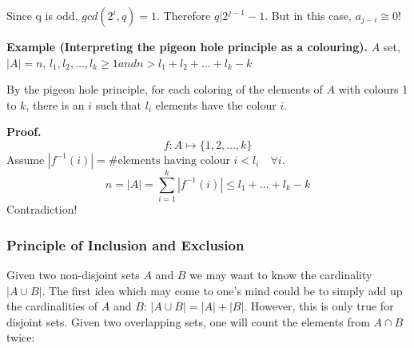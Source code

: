 Since q is odd, $gcd(2^i, q)=1$. Therefore $q | 2^{j-1} - 1$. But in this case, $a_{j-i}\cong 0$!


\textbf{Example (Interpreting the pigeon hole principle as a colouring).}
$A$ set, $|A| = n$,
$l_1, l_2, \ldots, l_k ≥ 1 and n > l_1 + l_2 + \ldots + l_k - k$

By the pigeon hole principle, for each coloring of the elements of $A$ with colours 1 to $k$, there is an $i$ such that $l_i$ elements have the colour $i$.

\textbf{Proof.}
\[
    f: A\mapsto \{1,2,\ldots,k\}
\]
Assume
    $|f^{-1}(i)| = \text{\#elements having colour $i$} < l_i
    \quad\forall i$.
\[
	n = |A| = \sum_{i=1}^k |f^{-1}(i)| ≤ l_1 +\ldots + l_k - k
\]
Contradiction!


\subsubsection{Principle of Inclusion and Exclusion}

Given two non-disjoint sets $A$ and $B$  we may want to know the cardinality $|A \cup B|$.
The first idea which may come to one's mind could be to simply add up the cardinalities of $A$ and $B$:
$|A \cup B| = |A| + |B|$. However, this
is only true for disjoint sets. Given two overlapping sets, one will count the elements from
$A \cap B$ twice:

